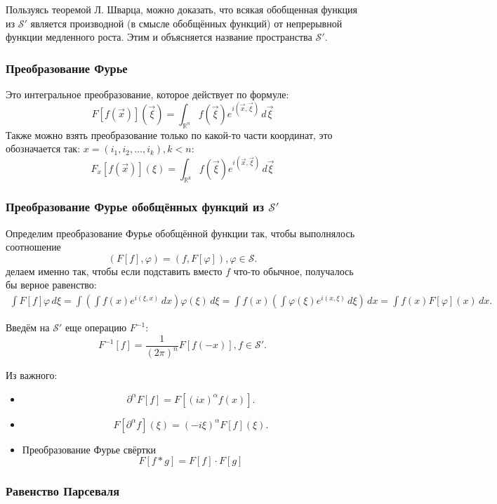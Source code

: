 Пользуясь теоремой Л. Шварца, можно доказать, что всякая обобщенная функция из $\mathcal{S}'$
является производной (в смысле обобщённых функций) от непрерывной функции медленного роста. Этим и
объясняется название пространства $\mathcal{S}'$.

\subsubsection{Преобразование Фурье}

Это интегральное преобразование, которое действует по формуле:
\[
  F[f(\vec{x})](\vec{\xi}) = \int_{\mathbb{R}^n} f(\vec{\xi}) e^{i (\vec{x},\vec{\xi})} \, d\vec{\xi}
\]
Также можно взять преобразование только по какой-то части координат, это обозначается так:
$x = (i_1, i_2, \dots, i_k), k < n$:
\[
  F_x [f(\vec{x})] (\xi) = \int_{\mathbb{R}^k} f(\vec{\xi}) e^{i (\vec{x}, \vec{\xi})} \, d\vec{\xi}
\]

\subsubsection{Преобразование Фурье обобщённых функций из $\mathcal{S}'$}

Определим преобразование Фурье обобщённой функции так, чтобы выполнялось соотношение
\[
  (F[f], \varphi) = (f, F[\varphi]), \varphi \in \mathcal{S}.
\]
делаем именно так, чтобы если подставить вместо $f$ что-то обычное, получалось бы верное равенство:
\begin{multline*}
  \int F[f] \varphi \, d\xi
  = \int \left( \int f(x) e^{i (\xi, x)} \, dx \right) \varphi(\xi) \, d\xi
  = \int f(x) \left( \int \varphi(\xi) e^{i (x, \xi)} \, d\xi \right) \, dx
  = \int f(x) F[\varphi](x) \, dx.
\end{multline*}

Введём на $\mathcal{S}'$ еще операцию $F^{-1}$:
\[
  F^{-1}[f] = \dfrac{1}{(2\pi)^n} F[f(-x)], f\in\mathcal{S}'.
\]

Из важного:
\begin{itemize}
  \item 
    \[
      \partial^\alpha F[f] = F \left[ (ix)^\alpha f(x) \right].
    \]
  \item
    \[
      F \left[ \partial^\alpha f \right] (\xi) = (-i\xi)^\alpha F[f] (\xi).
    \]
  \item Преобразование Фурье свёртки
    \[
      F \left[ f * g \right] = F[f] \cdot F[g]
    \]
\end{itemize}

\subsubsection{Равенство Парсеваля}

